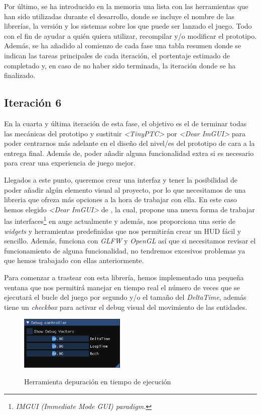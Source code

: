 Por último, se ha introducido en la memoria una lista con las herramientas que han sido utilizadas 
durante el desarrollo, donde se incluye el nombre de las librerías, la versión y los sistemas sobre los que
puede ser lanzado el juego. Todo con el fin de ayudar a quién quiera utilizar, recompilar y/o 
modificar el prototipo. Además, se ha añadido al comienzo de cada fase una tabla resumen donde se indican
las tareas principales de cada iteración, el portentaje estimado de completado y, en caso de no haber sido
terminada, la iteración donde se ha finalizado.


\subsection*{Iteración 6}
En la cuarta y última iteración de esta fase, el objetivo es el de terminar todas las mecánicas del prototipo
y sustituir \textit{\textless TinyPTC\textgreater} por \textit{\textless Dear ImGUI\textgreater} para poder
centrarnos más adelante en el diseño del nivel/es del prototipo de cara a la entrega final. Además de, poder
añadir alguna funcionalidad extra si es necesario para crear una experiencia de juego mejor.

Llegados a este punto, queremos crear una interfaz y tener la posibilidad de poder añadir algún elemento
visual al proyecto, por lo que necesitamos de una libreria que ofreza más opciones a la hora de trabajar
con ella. En este caso hemos elegido \textit{\textless Dear ImGUI\textgreater}
de \citeauthor*{dearimgui2021}, la cual, propone una nueva
forma de trabajar las interfaces\footnote{\textit{IMGUI (Immediate Mode GUI) paradigm.}} en auge actualmente
y además, nos proporciona una serie de \textit{widgets} y herramientas predefinidas que nos permitirán crear 
un HUD fácil y sencillo.
Además, funciona con \textit{GLFW} y \textit{OpenGL} así que si necesitamos revisar el funcionamiento de
alguna funcionalidad, no tendremos excesivos problemas ya que hemos trabajado con ellas anteriormente.


Para comenzar a trastear con esta librería, hemos implementado una pequeña ventana que nos permitirá manejar
en tiempo real el número de veces que se ejecutará el bucle del juego por segundo y/o el tamaño del 
\textit{DeltaTime}, además tiene un \textit{checkbox} para activar el debug visual del movimiento de las
entidades.

\begin{figure}[htb]
\centering
\includegraphics[width=0.45\textwidth]{imagenes/diario_desarrollo/hudDebug.png}\\
\caption{Herramienta depuración en tiempo de ejecución}
\label{fig:hudDebug}
\end{figure}

